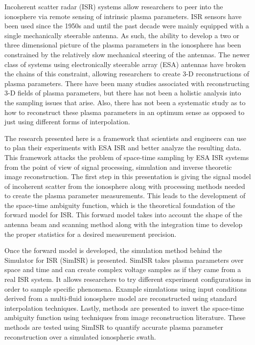 
Incoherent scatter radar (ISR) systems allow researchers to peer into the ionosphere via remote sensing of intrinsic plasma parameters. ISR sensors have been used since the 1950s and until the past decade were mainly equipped with a single mechanically steerable antenna. As such, the ability to develop a two or three dimensional picture of the plasma parameters in the ionosphere has been constrained by the relatively slow mechanical steering of the antennas. The newer class of systems using electronically steerable array (ESA) antennas have broken the chains of this constraint, allowing researchers to create 3-D reconstructions of plasma parameters. There have been many studies associated with reconstructing 3-D fields of plasma parameters, but there has not been a holistic analysis into the sampling issues that arise. Also, there has not been a systematic study as to how to reconstruct these plasma parameters in an optimum sense as opposed to just using different forms of interpolation.

The research presented here is a framework that scientists and engineers can use to plan their experiments with ESA ISR and better analyze the resulting data. This framework attacks the problem of space-time sampling by ESA ISR systems from the point of view of signal processing, simulation and inverse theoretic image reconstruction. The first step in this presentation is giving the signal model of incoherent scatter from the ionosphere along with processing methods needed to create the plasma parameter measurements. This leads to the development of the space-time ambiguity function, which is the theoretical foundation of the forward model for ISR. This forward model takes into account the shape of the antenna beam and scanning method along with the integration time to develop the proper statistics for a desired measurement precision.

Once the forward model is developed, the simulation method behind the Simulator for ISR (SimISR) is presented. SimISR takes plasma parameters over space and time and can create complex voltage samples as if they came from a real ISR system. It allows researchers to try different experiment configurations in order to sample specific phenomena. Example simulations using input conditions derived from a multi-fluid ionosphere model are reconstructed using standard interpolation techniques. Lastly, methods are presented to invert the space-time ambiguity function using techniques from image reconstruction literature. These methods are tested using SimISR to quantify accurate plasma parameter reconstruction over a simulated ionospheric swath.
